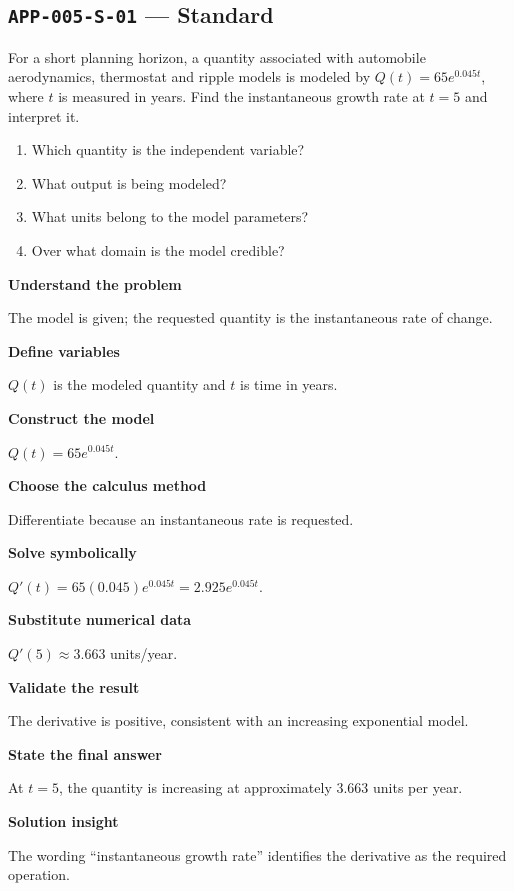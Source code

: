 \documentclass[11pt]{book}
\newcommand{\pid}[1]{\texttt{#1}}
\begin{document}
\subsection*{\pid{APP-005-S-01} — Standard}
\begin{problembox}
For a short planning horizon, a quantity associated with automobile aerodynamics, thermostat and ripple models is modeled by $Q(t)=65e^{0.045t}$, where $t$ is measured in years. Find the instantaneous growth rate at $t=5$ and interpret it.
\end{problembox}
\begin{promptbox}\begin{enumerate}
\item Which quantity is the independent variable?
\item What output is being modeled?
\item What units belong to the model parameters?
\item Over what domain is the model credible?
\end{enumerate}\end{promptbox}
\begin{solutionbox}
\textbf{Understand the problem}\par The model is given; the requested quantity is the instantaneous rate of change.\par\medskip
\textbf{Define variables}\par $Q(t)$ is the modeled quantity and $t$ is time in years.\par\medskip
\textbf{Construct the model}\par $Q(t)=65e^{0.045t}$.\par\medskip
\textbf{Choose the calculus method}\par Differentiate because an instantaneous rate is requested.\par\medskip
\textbf{Solve symbolically}\par $Q'(t)=65(0.045)e^{0.045t}=2.925e^{0.045t}$.\par\medskip
\textbf{Substitute numerical data}\par $Q'(5)\approx 3.663$ units/year.\par\medskip
\textbf{Validate the result}\par The derivative is positive, consistent with an increasing exponential model.\par\medskip
\textbf{State the final answer}\par At $t=5$, the quantity is increasing at approximately $3.663$ units per year.\par\medskip
\textbf{Solution insight}\par The wording “instantaneous growth rate” identifies the derivative as the required operation.\par\medskip
\end{solutionbox}
\end{document}
